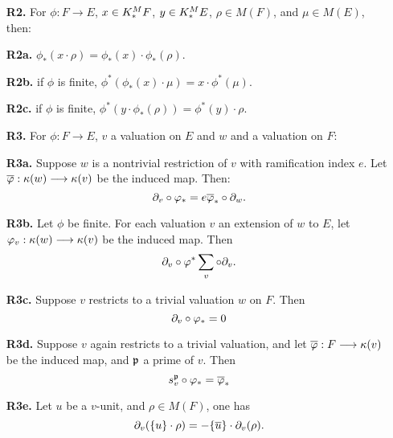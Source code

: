 \begin{definition}
\begin{enumerate}
\item[\textbf{R2.}] For $\phi: F \to E$, $x \in K^M_*F$, $y \in
K^M_*E$, $\rho \in M(F)$, and $\mu \in M(E)$, then:

\item[\textbf{R2a.}] $\phi_*(x \cdot \rho) = \phi_*(x) \cdot 
\phi_*(\rho)$.

\item[\textbf{R2b.}] if $\phi$ is finite, $\phi^*(\phi_*(x) \cdot 
\mu) = x \cdot \phi^*(\mu)$.

\item[\textbf{R2c.}] if $\phi$ is finite, $\phi^*(y \cdot 
\phi_*(\rho)) = \phi^*(y) \cdot \rho$.

\item[\textbf{R3.}] For $\phi: F \to E$, $v$ a valuation on $E$
and $w$ and a valuation on $F$:

\item[\textbf{R3a.}] Suppose $w$ is a nontrivial restriction of 
$v$ with ramification index $e$. Let $\overline{\varphi}: \kappa(w) \longrightarrow 
\kappa(v)$ be the induced map. Then:
\[
\partial_{v} \circ \varphi_* = e \overline{\varphi}_* \circ \partial_{w}.
\]

\item[\textbf{R3b.}] Let $\phi$ be finite. For each valuation $v$ 
an extension of $w$ to $E$, let $\varphi_v: \kappa(w) \longrightarrow \kappa(v)$
be the induced map. Then
\[
\partial_{v} \circ \varphi^* \sum_{v} \circ \partial_{v}.
\]

\item[\textbf{R3c.}] Suppose $v$ restricts to a trivial valuation
$w$ on $F$. Then
\[
\partial_{v} \circ \varphi_* = 0
\]

\item[\textbf{R3d.}] Suppose $v$ again restricts to a trivial 
valuation, and let $\overline{\varphi}: F \longrightarrow \kappa(v)$ be the induced map, and
$\mathfrak{p}$ a prime of $v$. Then
\[
s_{v}^{\mathfrak{p}} \circ \varphi_* = \overline{\varphi}_*
\]

\item[\textbf{R3e.}] Let $u$ be a $v$-unit, and $\rho \in M(F)$,
one has
\[
\partial_{v}(\{u\} \cdot \rho) = -\{\overline{u}\} \cdot \partial_{v}(\rho).
\]
\end{enumerate}
\end{definition}

